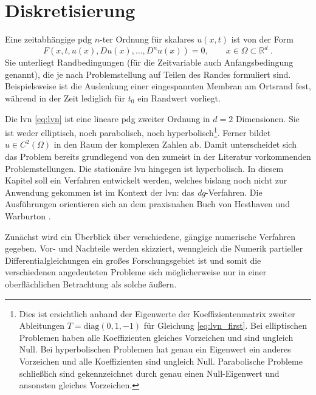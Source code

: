 \chapter{Diskretisierung}

Eine zeitabhängige \ac{pdg} $n$-ter Ordnung für skalares $u(x,t)$ ist von der Form
\begin{equation*}
  F(x, t, u(x), Du(x), \dots, D^nu(x))=0, \qquad x\in\Omega\subset\mathbb{R}^d \; .
\end{equation*}
Sie unterliegt Randbedingungen (für die Zeitvariable auch Anfangsbedingung genannt), die je nach Problemstellung auf Teilen des Randes formuliert sind. Beispielsweise ist die Auslenkung einer eingespannten Membran am Ortsrand fest, während in der Zeit lediglich für $t_0$ ein Randwert vorliegt.

Die \ac{lvn} \eqref{eq:lvn} ist eine lineare \ac{pdg} zweiter Ordnung in $d=2$ Dimensionen. Sie ist weder elliptisch, noch parabolisch, noch hyperbolisch\footnote{Dies ist ersichtlich anhand der Eigenwerte der Koeffizientenmatrix zweiter Ableitungen $T=\text{diag}(0,1,-1)$ für Gleichung \eqref{eq:lvn_first}. Bei elliptischen Problemen haben alle Koeffizienten gleiches Vorzeichen und sind ungleich Null. Bei hyperbolischen Problemen hat genau ein Eigenwert ein anderes Vorzeichen und alle Koeffizienten sind ungleich Null. Parabolische Probleme schließlich sind gekennzeichnet durch genau einen Null-Eigenwert und ansonsten gleiches Vorzeichen.}.
Ferner bildet $u\in C^2(\Omega)$ in den Raum der komplexen Zahlen ab. Damit unterscheidet sich das Problem bereits grundlegend von den zumeist in der Literatur vorkommenden Problemstellungen. Die stationäre \ac{lvn} hingegen ist hyperbolisch. In diesem Kapitel soll ein Verfahren entwickelt werden, welches bislang noch nicht zur Anwendung gekommen ist im Kontext der \ac{lvn}: das \emph{\ac{dg}}-Verfahren. Die Ausführungen orientieren sich an dem praxisnahen Buch von Hesthaven und Warburton \cite{buch}.

Zunächst wird ein Überblick über verschiedene, gängige numerische Verfahren gegeben. Vor- und Nachteile werden skizziert, wenngleich die Numerik partieller Differentialgleichungen ein großes Forschungsgebiet ist und somit die verschiedenen angedeuteten Probleme sich möglicherweise nur in einer oberflächlichen Betrachtung als solche äußern.

